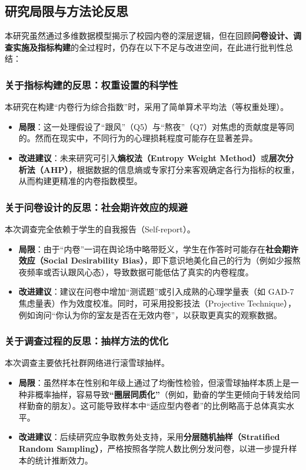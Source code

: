 \documentclass[win,thesis]{hustreport} %
\begin{document}
\subsection{研究局限与方法论反思}
本研究虽然通过多维数据模型揭示了校园内卷的深层逻辑，但在回顾\textbf{问卷设计、调查实施及指标构建}的全过程时，仍存在以下不足与改进空间，在此进行批判性总结：

\subsubsection*{关于指标构建的反思：权重设置的科学性}
本研究在构建“内卷行为综合指数”时，采用了简单算术平均法（等权重处理）。
\begin{itemize}
	\item \textbf{局限}：这一处理假设了“跟风”（Q5）与“熬夜”（Q7）对焦虑的贡献度是等同的。然而在现实中，不同行为的心理损耗程度可能存在显著差异。
	\item \textbf{改进建议}：未来研究可引入\textbf{熵权法（Entropy Weight Method）}或\textbf{层次分析法（AHP）}，根据数据的信息熵或专家打分来客观确定各行为指标的权重，从而构建更精准的内卷指数模型。
\end{itemize}

\subsubsection*{关于问卷设计的反思：社会期许效应的规避}
本次调查完全依赖于学生的自我报告（Self-report）。
\begin{itemize}
	\item \textbf{局限}：由于“内卷”一词在舆论场中略带贬义，学生在作答时可能存在\textbf{社会期许效应（Social Desirability Bias）}，即下意识地美化自己的行为（例如少报熬夜频率或否认跟风心态），导致数据可能低估了真实的内卷程度。
	\item \textbf{改进建议}：建议在问卷中增加“测谎题”或引入成熟的心理学量表（如 GAD-7 焦虑量表）作为效度校准。同时，可采用投影技法（Projective Technique），例如询问“你认为你的室友是否在无效内卷”，以获取更真实的观察数据。
\end{itemize}

\subsubsection*{关于调查过程的反思：抽样方法的优化}
本次调查主要依托社群网络进行滚雪球抽样。
\begin{itemize}
	\item \textbf{局限}：虽然样本在性别和年级上通过了均衡性检验，但滚雪球抽样本质上是一种非概率抽样，容易导致\textbf{“圈层同质化”}（例如，勤奋的学生更倾向于转发给同样勤奋的朋友）。这可能导致样本中“适应型内卷者”的比例略高于总体真实水平。
	\item \textbf{改进建议}：后续研究应争取教务处支持，采用\textbf{分层随机抽样（Stratified Random Sampling）}，严格按照各学院人数比例分发问卷，以进一步提升样本的统计推断效力。
\end{itemize}
\end{document}
